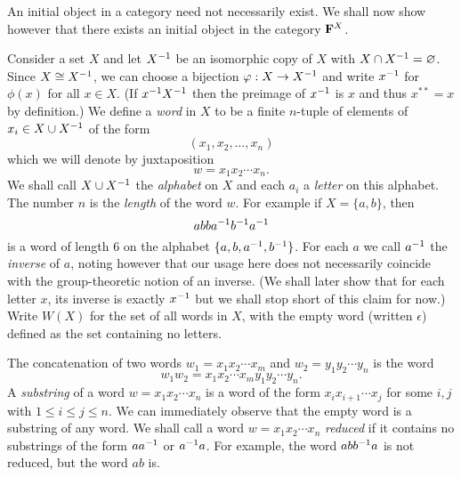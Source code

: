 An initial object in a category need not necessarily exist. We shall now show
however that there exists an initial object in the category \(\mathbf{F}^X\). 

Consider a set \(X\) and let \(X^{-1}\) be an isomorphic copy of \(X\) with \(X
\cap X^{-1} = \varnothing\). Since \(X \cong X^{-1}\), we can choose a bijection
\(\varphi : X \to X^{-1}\) and write \(x^{-1}\) for \(\phi(x)\) for all \(x \in X\).
(If \(x^{-1} X^{-1}\) then the preimage of \(x^{-1}\) is \(x\) and thus \(x^{**} =
x\) by definition.) We define a \emph{word} in \(X\) to be a finite \(n\)-tuple
of elements of \(x_i \in X \cup X^{-1}\) of the form
\[
    (x_1, x_2, \ldots, x_n)
\]
which we will denote by juxtaposition
\[
    w = x_1 x_2 \cdots x_n.
\]
We shall call \(X \cup X^{-1}\) the \emph{alphabet} on \(X\) and each \(a_i\) a
\emph{letter} on this alphabet. The number \(n\) is the \emph{length} of the
word \(w\). For example if \(X = \{a, b\}\), then
\[
    abba^{-1} b^{-1} a^{-1}
\]
is a word of length \(6\) on the alphabet \(\{a, b, a^{-1}, b^{-1}\}\). For each
\(a\) we call \(a^{-1}\) the \emph{inverse} of \(a\), noting however that our
usage here does not necessarily coincide with the group-theoretic notion of an
inverse. (We shall later show that for each letter \(x\), its inverse is exactly
\(x^{-1}\) but we shall stop short of this claim for now.) Write \(W(X)\) for the
set of all words in \(X\), with the empty word (written \(\epsilon\)) defined as
the set containing no letters.

The concatenation of two words \(w_1 = x_1 x_2 \cdots x_m\) and \(w_2 = y_1 y_2
\cdots y_n\) is the word
\[
    w_1 w_2 = x_1 x_2 \cdots x_m y_1 y_2 \cdots y_n.
\]
A \emph{substring} of a word \(w = x_1 x_2 \cdots x_n\) is a word of the form
\(x_i x_{i + 1} \cdots x_j\) for some \(i, j\) with \(1 \leq i \leq j \leq n\).
We can immediately observe that the empty word is a substring of any word. We
shall call a word \(w = x_1 x_2 \cdots x_n\) \emph{reduced} if it contains no
substrings of the form \(aa^{-1}\) or \(a^{-1} a\). For example, the word
\(abb^{-1} a\) is not reduced, but the word \(ab\) is.


